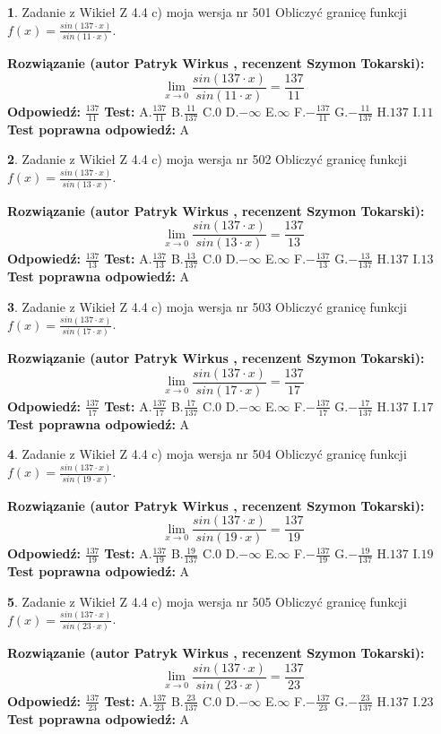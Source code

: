 \documentclass[12pt, a4paper]{article}
\theoremstyle{definition} %
\newtheorem{zad}{}
\newcommand{\zadStart}[1]{\begin{zad}#1\newline}
\newcommand{\zadStop}{\end{zad}}
\newcommand{\rozwStart}[2]{\noindent \textbf{Rozwiązanie (autor #1 , recenzent #2): }\newline}
\newcommand{\rozwStop}{\newline}
\newcommand{\odpStart}{\noindent \textbf{Odpowiedź:}\newline}
\newcommand{\odpStop}{\newline}
\newcommand{\testStart}{\noindent \textbf{Test:}\newline}
\newcommand{\testStop}{\newline}
\newcommand{\kluczStart}{\noindent \textbf{Test poprawna odpowiedź:}\newline}
\newcommand{\kluczStop}{\newline}
\begin{document}
\zadStart{Zadanie z Wikieł Z 4.4 c) moja wersja nr 501}
Obliczyć granicę funkcji $f(x)=\frac{sin(137\cdot x)}{sin(11\cdot x)}$.
\zadStop
\rozwStart{Patryk Wirkus}{Szymon Tokarski}
$$\lim\limits_{x\to 0}\frac{sin(137\cdot x)}{sin(11\cdot x)}=
\frac{137}{11}$$
\rozwStop
\odpStart
$\frac{137}{11}$
\odpStop
\testStart
A.$\frac{137}{11}$
B.$\frac{11}{137}$
C.$0$
D.$-\infty$
E.$\infty$
F.$-\frac{137}{11}$
G.$-\frac{11}{137}$
H.$137$
I.$11$
\testStop
\kluczStart
A
\kluczStop



\zadStart{Zadanie z Wikieł Z 4.4 c) moja wersja nr 502}
Obliczyć granicę funkcji $f(x)=\frac{sin(137\cdot x)}{sin(13\cdot x)}$.
\zadStop
\rozwStart{Patryk Wirkus}{Szymon Tokarski}
$$\lim\limits_{x\to 0}\frac{sin(137\cdot x)}{sin(13\cdot x)}=
\frac{137}{13}$$
\rozwStop
\odpStart
$\frac{137}{13}$
\odpStop
\testStart
A.$\frac{137}{13}$
B.$\frac{13}{137}$
C.$0$
D.$-\infty$
E.$\infty$
F.$-\frac{137}{13}$
G.$-\frac{13}{137}$
H.$137$
I.$13$
\testStop
\kluczStart
A
\kluczStop



\zadStart{Zadanie z Wikieł Z 4.4 c) moja wersja nr 503}
Obliczyć granicę funkcji $f(x)=\frac{sin(137\cdot x)}{sin(17\cdot x)}$.
\zadStop
\rozwStart{Patryk Wirkus}{Szymon Tokarski}
$$\lim\limits_{x\to 0}\frac{sin(137\cdot x)}{sin(17\cdot x)}=
\frac{137}{17}$$
\rozwStop
\odpStart
$\frac{137}{17}$
\odpStop
\testStart
A.$\frac{137}{17}$
B.$\frac{17}{137}$
C.$0$
D.$-\infty$
E.$\infty$
F.$-\frac{137}{17}$
G.$-\frac{17}{137}$
H.$137$
I.$17$
\testStop
\kluczStart
A
\kluczStop



\zadStart{Zadanie z Wikieł Z 4.4 c) moja wersja nr 504}
Obliczyć granicę funkcji $f(x)=\frac{sin(137\cdot x)}{sin(19\cdot x)}$.
\zadStop
\rozwStart{Patryk Wirkus}{Szymon Tokarski}
$$\lim\limits_{x\to 0}\frac{sin(137\cdot x)}{sin(19\cdot x)}=
\frac{137}{19}$$
\rozwStop
\odpStart
$\frac{137}{19}$
\odpStop
\testStart
A.$\frac{137}{19}$
B.$\frac{19}{137}$
C.$0$
D.$-\infty$
E.$\infty$
F.$-\frac{137}{19}$
G.$-\frac{19}{137}$
H.$137$
I.$19$
\testStop
\kluczStart
A
\kluczStop



\zadStart{Zadanie z Wikieł Z 4.4 c) moja wersja nr 505}
Obliczyć granicę funkcji $f(x)=\frac{sin(137\cdot x)}{sin(23\cdot x)}$.
\zadStop
\rozwStart{Patryk Wirkus}{Szymon Tokarski}
$$\lim\limits_{x\to 0}\frac{sin(137\cdot x)}{sin(23\cdot x)}=
\frac{137}{23}$$
\rozwStop
\odpStart
$\frac{137}{23}$
\odpStop
\testStart
A.$\frac{137}{23}$
B.$\frac{23}{137}$
C.$0$
D.$-\infty$
E.$\infty$
F.$-\frac{137}{23}$
G.$-\frac{23}{137}$
H.$137$
I.$23$
\testStop
\kluczStart
A
\kluczStop
\end{document}
